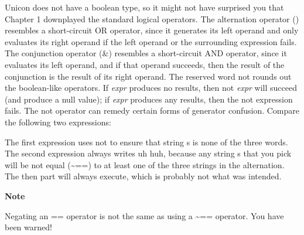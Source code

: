 Unicon does not have a boolean type, so it might not have surprised you
that Chapter 1 downplayed the standard logical operators. The
alternation operator
(\textsf{{\textbar}}) resembles a short-circuit OR
operator, since it generates its left operand and only evaluates its
right operand if the left operand or the surrounding expression fails.
The conjunction operator (\textsf{\&}) resembles a short-circuit
AND operator, since it evaluates its left operand,
and if that operand succeeds, then the result of the conjunction is the
result of its right operand. The reserved word \textsf{not} rounds out
the boolean-like operators. If \textsf{\textit{expr}} produces no
results, then \textsf{not }\textsf{\textit{expr}} will
succeed (and produce a null value); if \textsf{\textit{expr}} produces
any results, then the \textsf{not} expression fails. The \textsf{not}
operator can remedy certain forms of generator confusion. Compare the
following two expressions:



The first expression uses \textsf{not} to ensure that string \textsf{s}
is none of the three words. The second expression always writes
\textsf{{\textquotedbl}uh huh{\textquotedbl}}, because any string
\textsf{s} that you pick will be not equal (\textsf{\~{}==}) to at
least one of the three strings in the alternation. The \textsf{then}
part will always execute, which is probably not what was intended.

{\sffamily\bfseries
Note}

{\sffamily
Negating an == operator is not the same as using a \~{}== operator. You
have been warned!}

